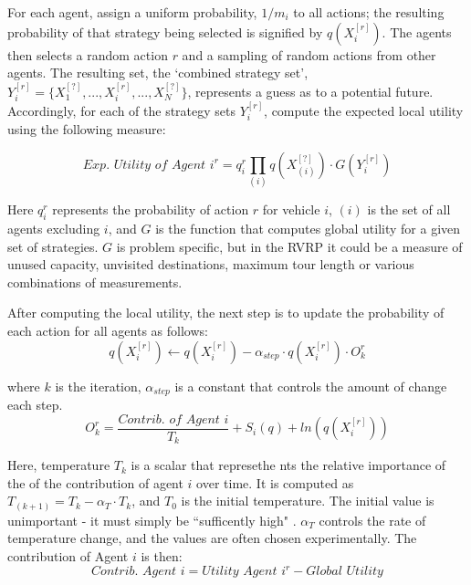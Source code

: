 \documentclass{sig-alternate}
\begin{document}
 For each agent, assign a uniform probability, $1/m_i$ to all actions; the resulting probability of that strategy being selected is signified by $q(X_i^{[r]})$. The agents then selects a random action $r$ and a sampling of random actions from other agents. The resulting set, the `combined strategy set', $Y_i^{[r]}=\{X_1^{[?]}, ...,X_i^{[r]}, ...,X_N^{[?]}\}$, represents a guess as to a potential future. Accordingly, for each of the strategy sets $Y_i^{[r]}$, compute the expected local utility using the following measure:

	\begin{equation}
	\textit{Exp. Utility of Agent } i^r =q_i^r\prod_{(i)}{q(X_{(i)}^{[?]})\cdot G(Y_i^{[r]})}
	\end{equation}
	
Here $q_i^r$ represents the probability of action $r$ for vehicle $i$, $(i)$ is the set of all agents excluding $i$, and $G$ is the function that computes global utility for a given set of strategies. $G$ is problem specific, but in the RVRP it could be a measure of unused capacity, unvisited destinations, maximum tour length or various combinations of measurements.

After computing the local utility, the next step is to update the probability of each action for all agents as follows:
	\begin{equation}
	q(X_i^{[r]})\leftarrow q(X_i^{[r]})-\alpha_{step}\cdot q(X_i^{[r]})\cdot O_k^r
	\end{equation}
	
where $k$ is the iteration, $\alpha_{step}$ is a constant that controls the amount of change each step.
	\begin{equation}
	O_k^r = \dfrac{\textit{Contrib. of Agent }i}{T_k}+S_i(q)+ln(q(X_i^{[r]}))
	\end{equation}
	
Here, temperature $T_k$ is a scalar that represethe nts the relative importance of the of the contribution of agent $i$ over time. It is computed as $T_{(k+1)}=T_{k} - \alpha_{T}\cdot T_{k}$, and $T_0$ is the initial temperature. The initial value is unimportant - it must simply be ``sufficently high" \cite{book}. $\alpha_{T}$ controls the rate of temperature change, and the values are often chosen experimentally.
The contribution of Agent $i$ is then:
	\begin{equation}
	\textit{Contrib. Agent }i = \textit{Utility Agent }i^r - \textit{Global Utility}
	\end{equation}
\end{document}
